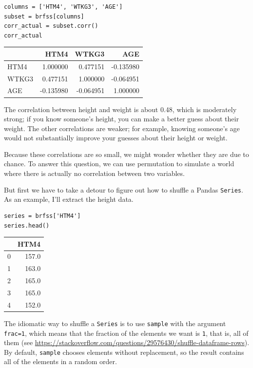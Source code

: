 \begin{lstlisting}[]
columns = ['HTM4', 'WTKG3', 'AGE']
subset = brfss[columns]
corr_actual = subset.corr()
corr_actual
\end{lstlisting}

\begin{tabular}{lrrr}
\midrule
{} &      HTM4 &     WTKG3 &       AGE \\
\midrule
HTM4  &  1.000000 &  0.477151 & -0.135980 \\
WTKG3 &  0.477151 &  1.000000 & -0.064951 \\
AGE   & -0.135980 & -0.064951 &  1.000000 \\
\midrule
\end{tabular}

The correlation between height and weight is about 0.48, which is
moderately strong; if you know someone's height, you can make a better
guess about their weight. The other correlations are weaker; for
example, knowing someone's age would not substantially improve your
guesses about their height or weight.

Because these correlations are so small, we might wonder whether they
are due to chance. To answer this question, we can use permutation to
simulate a world where there is actually no correlation between two
variables.

But first we have to take a detour to figure out how to shuffle a Pandas
\passthrough{\lstinline!Series!}. As an example, I'll extract the height
data.

\begin{lstlisting}[]
series = brfss['HTM4']
series.head()
\end{lstlisting}

\begin{tabular}{lr}
\midrule
{} &   HTM4 \\
\midrule
0 &  157.0 \\
1 &  163.0 \\
2 &  165.0 \\
3 &  165.0 \\
4 &  152.0 \\
\midrule
\end{tabular}

The idiomatic way to shuffle a \passthrough{\lstinline!Series!} is to
use \passthrough{\lstinline!sample!} with the argument
\passthrough{\lstinline!frac=1!}, which means that the fraction of the
elements we want is \passthrough{\lstinline!1!}, that is, all of them
(see
\url{https://stackoverflow.com/questions/29576430/shuffle-dataframe-rows}).
By default, \passthrough{\lstinline!sample!} chooses elements without
replacement, so the result contains all of the elements in a random
order.

